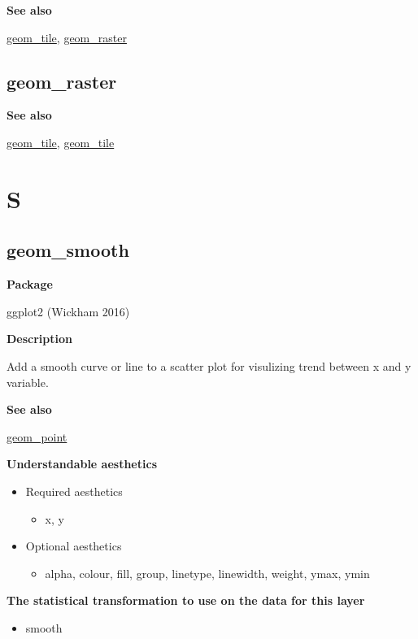 \documentclass[
  letterpaper,
  DIV=11,
  numbers=noendperiod]{scrreprt}
\providecommand{\tightlist}{%
  \setlength{\itemsep}{0pt}\setlength{\parskip}{0pt}}\usepackage{longtable,booktabs,array}
\begin{document}
\textbf{See also}

\hyperref[tile]{geom\_tile}, \hyperref[raster]{geom\_raster}

\section{geom\_raster}\label{geom_raster}

\textbf{See also}

\hyperref[rect]{geom\_tile}, \hyperref[tile]{geom\_tile}


\chapter{S}\label{sec-s}

\section{geom\_smooth}\label{geom_smooth}

\textbf{Package}

ggplot2 (Wickham 2016)

\textbf{Description}

Add a smooth curve or line to a scatter plot for visulizing trend
between x and y variable.

\textbf{See also}

\hyperref[point]{geom\_point}

\textbf{Understandable aesthetics}

\begin{itemize}
\tightlist
\item
  Required aesthetics

  \begin{itemize}
  \tightlist
  \item
    x, y
  \end{itemize}
\item
  Optional aesthetics

  \begin{itemize}
  \tightlist
  \item
    alpha, colour, fill, group, linetype, linewidth, weight, ymax, ymin
  \end{itemize}
\end{itemize}

\textbf{The statistical transformation to use on the data for this
layer}

\begin{itemize}
\tightlist
\item
  smooth
\end{itemize}
\end{document}
